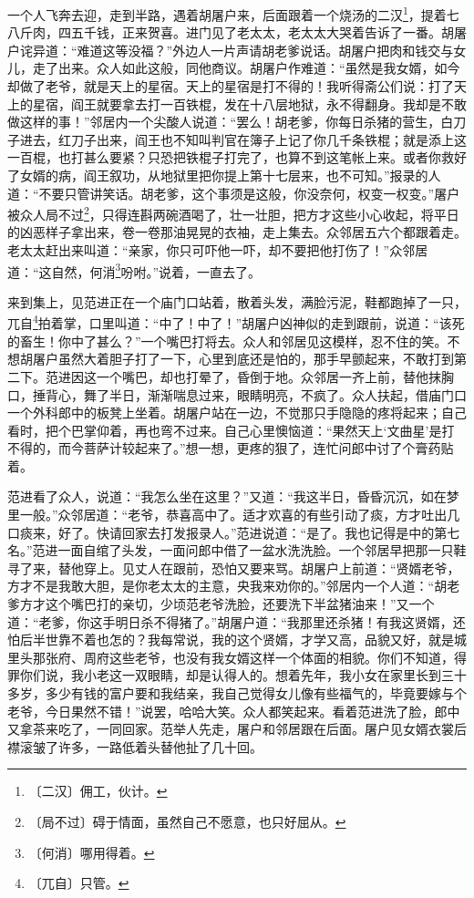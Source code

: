 \documentclass[12pt,UTF-8,openany]{ctexbook}
\begin{document}
\begin{large}
    一个人飞奔去迎，走到半路，遇着胡屠户来，后面跟着一个烧汤的二汉\footnote{〔二汉〕佣工，伙计。}，提着七八斤肉，四五千钱，正来贺喜。进门见了老太太，老太太大哭着告诉了一番。胡屠户诧异道：“难道这等没福？”外边人一片声请胡老爹说话。胡屠户把肉和钱交与女儿，走了出来。众人如此这般，同他商议。胡屠户作难道：“虽然是我女婿，如今却做了老爷，就是天上的星宿。天上的星宿是打不得的！我听得斋公们说：打了天上的星宿，阎王就要拿去打一百铁棍，发在十八层地狱，永不得翻身。我却是不敢做这样的事！”邻居内一个尖酸人说道：“罢么！胡老爹，你每日杀猪的营生，白刀子进去，红刀子出来，阎王也不知叫判官在簿子上记了你几千条铁棍；就是添上这一百棍，也打甚么要紧？只恐把铁棍子打完了，也算不到这笔帐上来。或者你救好了女婿的病，阎王叙功，从地狱里把你提上第十七层来，也不可知。”报录的人道：“不要只管讲笑话。胡老爹，这个事须是这般，你没奈何，权变一权变。”屠户被众人局不过\footnote{〔局不过〕碍于情面，虽然自己不愿意，也只好屈从。}，只得连斟两碗酒喝了，壮一壮胆，把方才这些小心收起，将平日的凶恶样子拿出来，卷一卷那油晃晃的衣袖，走上集去。众邻居五六个都跟着走。老太太赶出来叫道：“亲家，你只可吓他一吓，却不要把他打伤了！”众邻居道：“这自然，何消\footnote{〔何消〕哪用得着。}吩咐。”说着，一直去了。
    
    来到集上，见范进正在一个庙门口站着，散着头发，满脸污泥，鞋都跑掉了一只，兀自\footnote{〔兀自〕只管。}拍着掌，口里叫道：“中了！中了！”胡屠户凶神似的走到跟前，说道：“该死的畜生！你中了甚么？”一个嘴巴打将去。众人和邻居见这模样，忍不住的笑。不想胡屠户虽然大着胆子打了一下，心里到底还是怕的，那手早颤起来，不敢打到第二下。范进因这一个嘴巴，却也打晕了，昏倒于地。众邻居一齐上前，替他抹胸口，捶背心，舞了半日，渐渐喘息过来，眼睛明亮，不疯了。众人扶起，借庙门口一个外科郎中的板凳上坐着。胡屠户站在一边，不觉那只手隐隐的疼将起来；自己看时，把个巴掌仰着，再也弯不过来。自己心里懊恼道：“果然天上‘文曲星’是打不得的，而今菩萨计较起来了。”想一想，更疼的狠了，连忙问郎中讨了个膏药贴着。
    
    范进看了众人，说道：“我怎么坐在这里？”又道：“我这半日，昏昏沉沉，如在梦里一般。”众邻居道：“老爷，恭喜高中了。适才欢喜的有些引动了痰，方才吐出几口痰来，好了。快请回家去打发报录人。”范进说道：“是了。我也记得是中的第七名。”范进一面自绾了头发，一面问郎中借了一盆水洗洗脸。一个邻居早把那一只鞋寻了来，替他穿上。见丈人在跟前，恐怕又要来骂。胡屠户上前道：“贤婿老爷，方才不是我敢大胆，是你老太太的主意，央我来劝你的。”邻居内一个人道：“胡老爹方才这个嘴巴打的亲切，少顷范老爷洗脸，还要洗下半盆猪油来！”又一个道：“老爹，你这手明日杀不得猪了。”胡屠户道：“我那里还杀猪！有我这贤婿，还怕后半世靠不着也怎的？我每常说，我的这个贤婿，才学又高，品貌又好，就是城里头那张府、周府这些老爷，也没有我女婿这样一个体面的相貌。你们不知道，得罪你们说，我小老这一双眼睛，却是认得人的。想着先年，我小女在家里长到三十多岁，多少有钱的富户要和我结亲，我自己觉得女儿像有些福气的，毕竟要嫁与个老爷，今日果然不错！”说罢，哈哈大笑。众人都笑起来。看着范进洗了脸，郎中又拿茶来吃了，一同回家。范举人先走，屠户和邻居跟在后面。屠户见女婿衣裳后襟滚皱了许多，一路低着头替他扯了几十回。
    

\end{large}
\end{document}
